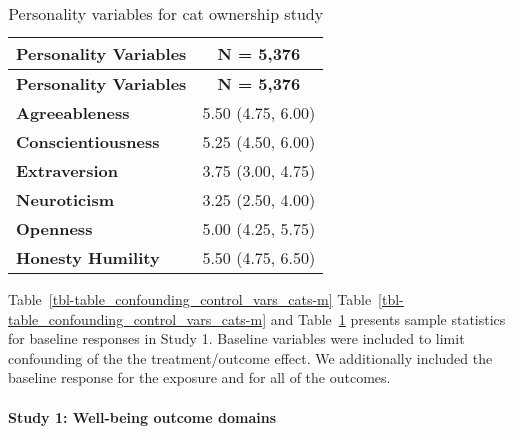 \documentclass[
  singlecolumn,
  9pt]{article}
\let\oldparagraph\paragraph
\renewcommand{\paragraph}[1]{\oldparagraph{#1}\mbox{}}
\begin{document}
\newpage{}

\begin{longtable}[]{@{}lc@{}}
\caption{Personality variables for cat ownership
study}\label{tbl-table_baseline_personality_cats-m}\tabularnewline
\toprule\noalign{}
\textbf{Personality Variables} & \textbf{N = 5,376} \\
\midrule\noalign{}
\endfirsthead
\toprule\noalign{}
\textbf{Personality Variables} & \textbf{N = 5,376} \\
\midrule\noalign{}
\endhead
\bottomrule\noalign{}
\endlastfoot
\textbf{Agreeableness} & 5.50 (4.75, 6.00) \\
\textbf{Conscientiousness} & 5.25 (4.50, 6.00) \\
\textbf{Extraversion} & 3.75 (3.00, 4.75) \\
\textbf{Neuroticism} & 3.25 (2.50, 4.00) \\
\textbf{Openness} & 5.00 (4.25, 5.75) \\
\textbf{Honesty Humility} & 5.50 (4.75, 6.50) \\
\end{longtable}

Table~\ref{tbl-table_confounding_control_vars_cats-m}
Table~\ref{tbl-table_confounding_control_vars_cats-m} and
Table~\ref{tbl-table_baseline_personality_cats-m} presents sample
statistics for baseline responses in Study 1. Baseline variables were
included to limit confounding of the the treatment/outcome effect. We
additionally included the baseline response for the exposure and for all
of the outcomes.

\newpage{}

\paragraph{Study 1: Well-being outcome
domains}\label{study-1-well-being-outcome-domains}
\end{document}
